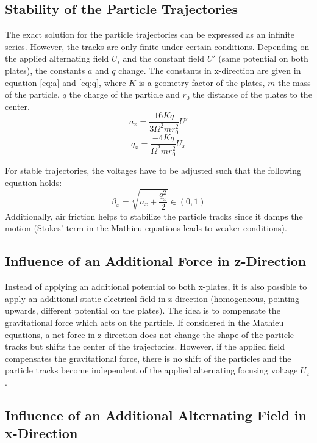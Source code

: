\documentclass[
	paper=A4,
	parskip=full,
	chapterprefix=true,
	11pt,
	headings=normal,
	bibliography=totoc,
	listof=totoc,
	titlepage=on,
]{scrreprt}
\begin{document}
\subsection{Stability of the Particle Trajectories}
The exact solution for the particle trajectories can be expressed as an infinite series. However, the tracks are only finite under certain conditions. Depending on the applied alternating field $U_i$ and the constant field $U'$ (same potential on both plates), the constants $a$ and $q$ change. The constants in x-direction are given in equation \ref{eq:a} and \ref{eq:q}, where $K$ is a geometry factor of the plates, $m$ the mass of the particle, $q$ the charge of the particle and $r_0$ the distance of the plates to the center.
\begin{equation}
	\label{eq:a}
	a_x=\frac{16 K q}{3 \Omega^2 m r_0^2} U'
\end{equation}
\begin{equation}
	\label{eq:q}
	q_x= \frac{-4 K q}{ \Omega^2 m r_0^2} U_{x}
\end{equation}

For stable trajectories, the voltages have to be adjusted such that the following equation holds\cite{Lab_manual}:
\begin{equation}
	\label{eq:beta}
	\beta_x  = \sqrt{a_x+\frac{q_x^2}{2}}  \in (0,1)
\end{equation}
Additionally, air friction helps to stabilize the particle tracks since it damps the motion (Stokes' term in the Mathieu equations leads to weaker conditions). 

\subsection{Influence of an Additional Force in z-Direction}
Instead of applying an additional potential to both x-plates, it is also possible to apply an additional static electrical field in z-direction (homogeneous, pointing upwards, different potential on the plates). The idea is to compensate the gravitational force which acts on the particle. If considered in the Mathieu equations, a net force in z-direction does not change the shape of the particle tracks but shifts the center of the trajectories. However, if the applied field compensates the gravitational force, there is no shift of the particles and the particle tracks become independent of the applied alternating focusing voltage $U_z$ \cite{Lab_manual}.

\subsection{Influence of an Additional Alternating Field in x-Direction}
\end{document}
